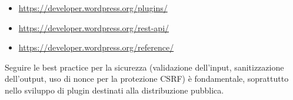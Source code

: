 \begin{itemize}
    \item \url{https://developer.wordpress.org/plugins/}
    \item \url{https://developer.wordpress.org/rest-api/}
    \item \url{https://developer.wordpress.org/reference/}
\end{itemize}

Seguire le best practice per la sicurezza (validazione dell'input, sanitizzazione dell'output, uso di nonce per la protezione CSRF) è fondamentale, soprattutto nello sviluppo di plugin destinati alla distribuzione pubblica.
